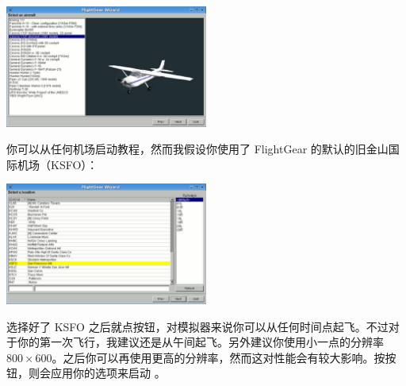 \begin{center}
\includegraphics[width=0.5\textwidth]{img/tut_2}
\end{center}

\ifchinese
你可以从任何机场启动教程，然而我假设你使用了 FlightGear 的默认的旧金山国际机场（KSFO）：
\fi

{}

\begin{center}
\includegraphics[width=0.5\textwidth]{img/tut_3}
\end{center}

\ifchinese
选择好了 KSFO 之后就点按钮，对模拟器来说你可以从任何时间点起飞。不过对于你的第一次飞行，我建议还是从午间起飞。另外建议你使用小一点的分辨率 $800\times600$。之后你可以再使用更高的分辨率，然而这对性能会有较大影响。按按钮，则会应用你的选项来启动 \FlightGear{}。
\fi

{}


